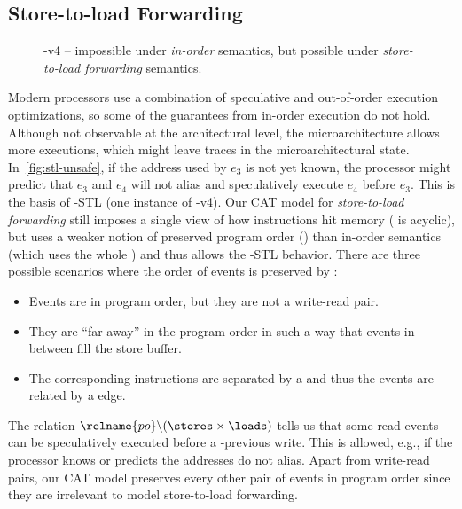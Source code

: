 \documentclass[conference]{IEEEtran}
\begin{document}
\subsection{Store-to-load Forwarding}
\label{sec:stl}

\begin{figure}[t]
\centering
\scalebox{.8}{}
\caption{\spectre-v4 -- impossible under \emph{in-order} semantics, but possible under \emph{store-to-load forwarding} semantics.}
\label{fig:stl-unsafe}
\end{figure}

Modern processors %
use a combination of speculative and out-of-order execution optimizations,
so some of the guarantees from in-order execution do not hold.
Although not observable at the architectural level, the microarchitecture allows more executions, which might leave traces in the microarchitectural state.
In~\autoref{fig:stl-unsafe}, if the address used by $e_3$ is not yet known, the processor might predict that $e_3$ and $e_4$ will not alias and speculatively execute $e_4$ before $e_3$.
This is the basis of \spectre-\textsc{STL} (one instance of \spectre-v4).
Our CAT model for \emph{store-to-load forwarding} still imposes a single view of how instructions hit memory ( is acyclic), but uses a weaker notion of preserved program order () than in-order semantics (which uses the whole ) and thus allows the \spectre-\textsc{STL} behavior.
There are three possible scenarios where the order of events is preserved by :
\begin{itemize}
  \item Events are in program order, but they are not a write-read pair.
  \item They are \enquote{far away} in the program order in such a way that events in between fill the store buffer.
  \item The corresponding instructions are separated by a \fence and thus the events are related by a  edge.
\end{itemize}
The relation ${\relname{po} \backslash (\stores \times \loads)}$ tells us that some read events can be speculatively executed before a -previous write.
This is allowed, e.g., if the processor knows or predicts the addresses do not alias.
Apart from write-read pairs, our CAT model preserves every other pair of events in program order since they are irrelevant to model store-to-load forwarding.
\end{document}
